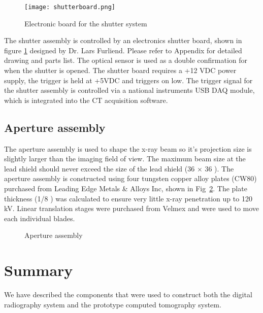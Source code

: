 \begin{figure}
\centering
\texttt{[image: shutterboard.png]}
\caption{Electronic board for the shutter system}
\label{fig:shutterboard}
\end{figure}

The shutter assembly is controlled by an electronics shutter board, shown in figure \ref{fig:shutterboard} designed by Dr. Lars Furliend.  Please refer to Appendix for detailed drawing and parts list.  The optical sensor is used as a double confirmation for when the shutter is opened.  The shutter board requires a +12 VDC power supply, the trigger is held at +5VDC and triggers on low.  The trigger signal for the shutter assembly is controlled via a national instruments USB DAQ module, which is integrated into the CT acquisition software.
		
\subsection{Aperture assembly}
The aperture assembly is used to shape the x-ray beam so it's projection size is slightly larger than the imaging field of view.  The maximum beam size at the lead shield should never exceed the size of the lead shield (36 \inches $\times$ 36 \inches).  The aperture assembly is constructed using four tungsten copper alloy plates (CW80) purchased from Leading Edge Metals \& Alloys Inc, shown in Fig~\ref{fig:aperture}.  The plate thickness (1/8 \inches) was calculated to ensure very little x-ray penetration up to 120 kV.  Linear translation stages were purchased from Velmex and were used to move each individual blades.

\begin{figure}
\centering
{}
\caption{Aperture assembly}
\label{fig:aperture}
\end{figure}

\section{Summary}
We have described the components that were used to construct both the digital radiography system and the prototype computed tomography system.
